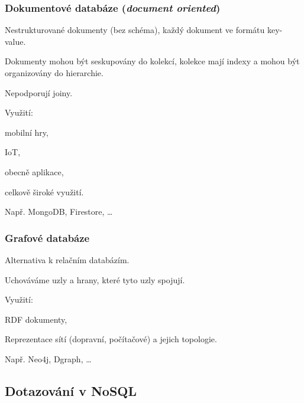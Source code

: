 \subsubsection*{Dokumentové databáze (\textit{document oriented})}

\begin{compactitem}
    \item Nestrukturované dokumenty (bez schéma), každý dokument ve formátu key-value.
    \item Dokumenty mohou být seskupovány do kolekcí, kolekce mají indexy a mohou být organizovány do hierarchie.
    \item Nepodporují joiny.
    \item Využití: \begin{compactitem}
        \item mobilní hry,
        \item IoT,
        \item obecně aplikace,
        \item celkově široké využití.
    \end{compactitem}
    \item Např. MongoDB, Firestore, \dots
\end{compactitem}


\subsubsection*{Grafové databáze}

\begin{compactitem}
    \item Alternativa k relačním databázím.
    \item Uchováváme uzly a hrany, které tyto uzly spojují.
    \item Využití: \begin{compactitem}
        \item RDF dokumenty,
        \item Reprezentace sítí (dopravní, počítačové) a jejich topologie.
    \end{compactitem}
    \item Např. Neo4j, Dgraph, \dots
\end{compactitem}

\subsection{Dotazování v NoSQL}

